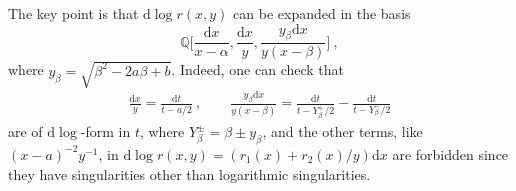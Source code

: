 \documentclass[a4paper,12pt]{article}
\newcommand{\dif}{\mathrm{d}} %
\begin{document}
The key point is that $\dif \log r(x,y)$ can be expanded in the basis
\begin{equation}
    \mathbb{Q}\biggl[\frac{\dif x}{x-\alpha},\frac{\dif x}{y},\frac{y_{\beta}\dif x}{y(x-\beta)}\biggr] \:,
\end{equation}
where $y_{\beta}=\sqrt{\beta^{2}-2a\beta+b}$. Indeed, one can check that
\begin{align}
    \frac{\dif x}{y}=\frac{\dif t}{t-a/2}\:, \qquad \frac{y_{\beta}\dif x}{y(x-\beta)}= \frac{\dif t}{t-Y_{\beta}^{+}/2}- \frac{\dif t}{t-Y_{\beta}^{-}/2} \label{dxtodt}
\end{align}
are of $\dif \log$-form in $t$, where $Y_{\beta}^{\pm}=\beta\pm y_{\beta}$, and the other terms, like $(x-a)^{-2}y^{-1}$, in $\dif \log r(x,y)=(r_{1}(x)+r_{2}(x)/y) \dif x$ are forbidden since they have singularities other than logarithmic singularities.
\end{document}

